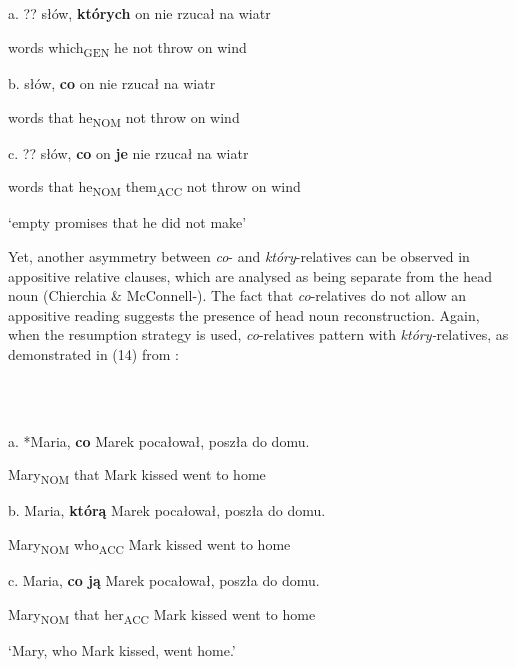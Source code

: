 \documentclass[output=paper]{langsci/langscibook}
\begin{document}
\ea%
    \label{ex:key:13}
    \gll\\
        \\
    \glt
    \z

          a.   ??  słów,   \textbf{których}   on  nie rzucał  na wiatr

    words   which\textsubscript{GEN}   he   not throw   on wind

  b.   słów,   \textbf{co}   on   nie rzucał na wiatr

    words  that   he\textsubscript{NOM}   not throw on wind

  c.     ??  słów,   \textbf{co}   on   \textbf{je}   nie   rzucał na wiatr

    words   that he\textsubscript{NOM}   them\textsubscript{ACC}   not   throw   on wind

    ‘empty promises that he did not make’

Yet, another asymmetry between \textit{co}{}- and \textit{który}{}-relatives can be observed in appositive relative clauses, which are analysed as being separate from the head noun (Chierchia \& McConnell-\citealt{Ginet1999}). The fact that \textit{co}{}-relatives do not allow an appositive reading suggests the presence of head noun reconstruction. Again, when the resumption strategy is used, \textit{co}{}-relatives pattern with \textit{który-}relatives, as demonstrated in (14) from \citet[378]{Szczegielniak2006}:

\ea%
    \label{ex:key:14}
    \gll\\
        \\
    \glt
    \z

          a.       *Maria,   \textbf{co}   Marek pocałował,   poszła   do   domu.

      Mary\textsubscript{NOM} that  Mark   kissed\textsubscript{} went   to   home

  b.   Maria,   \textbf{którą}   Marek   pocałował,   poszła do domu.

    Mary\textsubscript{NOM}   who\textsubscript{ACC}   Mark   kissed\textsubscript{}    went   to   home

  c.   Maria,   \textbf{co   ją}   Marek pocałował,   poszła do   domu.

    Mary\textsubscript{NOM}   that   her\textsubscript{ACC}   Mark   kissed\textsubscript{}    went   to   home

    ‘Mary, who Mark kissed, went home.’
\end{document}
